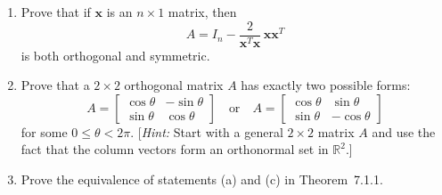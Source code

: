 \documentclass{article}
\theoremstyle{mystyle}
\begin{document}
\begin{enumerate}
\item[25.] Prove that if $\mathbf{x}$ is an $n\times 1$ matrix, then
\[
  A = I_n - \frac{2}{\mathbf{x}^T\mathbf{x}}\,\mathbf{x}\mathbf{x}^T
\]
is both orthogonal and symmetric.

\item[26.] Prove that a $2\times 2$ orthogonal matrix $A$ has exactly two possible
forms:
\[
  A = \begin{bmatrix}\cos\theta & -\sin\theta\\\sin\theta & \cos\theta\end{bmatrix}
  \quad\text{or}\quad
  A = \begin{bmatrix}\cos\theta & \sin\theta\\\sin\theta & -\cos\theta\end{bmatrix}
\]
for some $0\le\theta<2\pi$. [\textit{Hint:} Start with a general $2\times 2$ matrix $A$
and use the fact that the column vectors form an orthonormal set in $\mathbb{R}^2$.]

\item[30.] Prove the equivalence of statements (a) and (c) in Theorem~7.1.1.

\end{enumerate}
\end{document}
